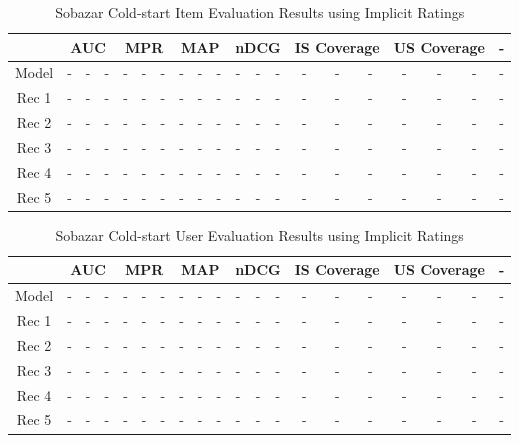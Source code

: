 \begin{table}
\centering
\begin{tabular}{|c|*{18}{c|}c|}
\hline
&	 \multicolumn{3}{c|}{AUC} & \multicolumn{3}{c|}{MPR} &	 \multicolumn{3}{c|}{MAP} &	 \multicolumn{3}{c|}{nDCG} & \multicolumn{3}{c|}{IS Coverage} & \multicolumn{3}{c|}{US Coverage} & 	-	\\\hline 
Model 		& - & - & - & - & - & - & - & - & - & - & - & - & - & - & - & - & - & - & -  \\ \hline
Rec 1 		& - & - & - & - & - & - & - & - & - & - & - & - & - & - & - & - & - & - & -  \\ \hline
Rec 2 		& - & - & - & - & - & - & - & - & - & - & - & - & - & - & - & - & - & - & -  \\ \hline
Rec 3 		& - & - & - & - & - & - & - & - & - & - & - & - & - & - & - & - & - & - & -  \\ \hline
Rec 4			& - & - & - & - & - & - & - & - & - & - & - & - & - & - & - & - & - & - & -  \\ \hline
Rec 5			& - & - & - & - & - & - & - & - & - & - & - & - & - & - & - & - & - & - & -  \\ \hline
\end{tabular}
\caption{Sobazar Cold-start Item Evaluation Results using Implicit Ratings}
\end{table}

\begin{table}
\centering
\begin{tabular}{|c|*{18}{c|}c|}
\hline
&	 \multicolumn{3}{c|}{AUC} & \multicolumn{3}{c|}{MPR} &	 \multicolumn{3}{c|}{MAP} &	 \multicolumn{3}{c|}{nDCG} & \multicolumn{3}{c|}{IS Coverage} & \multicolumn{3}{c|}{US Coverage} & 	-	\\\hline 
Model 		& - & - & - & - & - & - & - & - & - & - & - & - & - & - & - & - & - & - & -  \\ \hline
Rec 1 		& - & - & - & - & - & - & - & - & - & - & - & - & - & - & - & - & - & - & -  \\ \hline
Rec 2 		& - & - & - & - & - & - & - & - & - & - & - & - & - & - & - & - & - & - & -  \\ \hline
Rec 3 		& - & - & - & - & - & - & - & - & - & - & - & - & - & - & - & - & - & - & -  \\ \hline
Rec 4			& - & - & - & - & - & - & - & - & - & - & - & - & - & - & - & - & - & - & -  \\ \hline
Rec 5			& - & - & - & - & - & - & - & - & - & - & - & - & - & - & - & - & - & - & -  \\ \hline
\end{tabular}
\caption{Sobazar Cold-start User Evaluation Results using Implicit Ratings}
\end{table}








